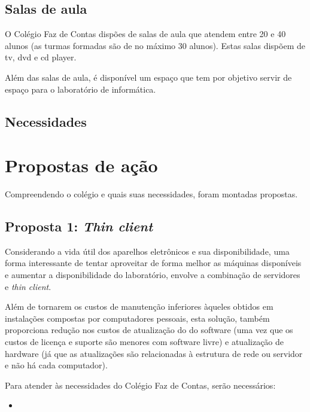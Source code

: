 \documentclass[a4paper,12pt]{report}
\begin{document}
            \subsection{Salas de aula}
            O Colégio Faz de Contas dispões de salas de aula que atendem entre
            20 e 40 alunos (as turmas formadas são de no máximo 30 alunos).
            Estas salas dispõem de tv, dvd e cd player.

            Além das salas de aula, é disponível um espaço que tem por
            objetivo servir de espaço para o laboratório de informática.

            \subsection{Necessidades}

        \section{Propostas de ação}
        \label{sc:laboratorio_proposta}
        Compreendendo o colégio e quais suas necessidades, foram montadas
        propostas.

            \subsection{Proposta 1: \emph{Thin client}}
            Considerando a vida útil dos aparelhos eletrônicos e sua
            disponibilidade, uma forma interessante de tentar aproveitar de
            forma melhor as máquinas disponíveis e aumentar a disponibilidade
            do laboratório, envolve a combinação de servidores e \emph{thin
            client}.

            Além de tornarem os custos de manutenção inferiores àqueles
            obtidos em instalações compostas por computadores pessoais, esta
            solução, também proporciona redução nos custos de atualização do
            do software (uma vez que os custos de licença e suporte são
            menores com software livre) e atualização de hardware (já que as
            atualizações são relacionadas à estrutura de rede ou servidor e não
            há cada computador).

            Para atender às necessidades do Colégio Faz de Contas, serão
            necessários:

            \begin{itemize}

                \item 
            \end{itemize}
\end{document}
